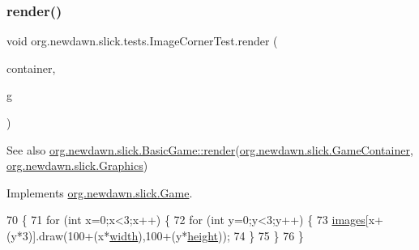 \subsubsection{\texorpdfstring{render()}{render()}}
{\footnotesize\ttfamily void org.\+newdawn.\+slick.\+tests.\+Image\+Corner\+Test.\+render (\begin{DoxyParamCaption}\item[{\mbox{\hyperlink{classorg_1_1newdawn_1_1slick_1_1_game_container}{Game\+Container}}}]{container,  }\item[{\mbox{\hyperlink{classorg_1_1newdawn_1_1slick_1_1_graphics}{Graphics}}}]{g }\end{DoxyParamCaption})\hspace{0.3cm}{\ttfamily [inline]}}

\begin{DoxySeeAlso}{See also}
\mbox{\hyperlink{interfaceorg_1_1newdawn_1_1slick_1_1_game_af1a4670d43eb3ba04dfcf55ab1975b64}{org.\+newdawn.\+slick.\+Basic\+Game\+::render}}(\mbox{\hyperlink{classorg_1_1newdawn_1_1slick_1_1_game_container}{org.\+newdawn.\+slick.\+Game\+Container}}, \mbox{\hyperlink{classorg_1_1newdawn_1_1slick_1_1_graphics}{org.\+newdawn.\+slick.\+Graphics}}) 
\end{DoxySeeAlso}


Implements \mbox{\hyperlink{interfaceorg_1_1newdawn_1_1slick_1_1_game_af1a4670d43eb3ba04dfcf55ab1975b64}{org.\+newdawn.\+slick.\+Game}}.


\begin{DoxyCode}
70                                                             \{
71         \textcolor{keywordflow}{for} (\textcolor{keywordtype}{int} x=0;x<3;x++) \{
72             \textcolor{keywordflow}{for} (\textcolor{keywordtype}{int} y=0;y<3;y++) \{
73                 \mbox{\hyperlink{classorg_1_1newdawn_1_1slick_1_1tests_1_1_image_corner_test_ae322db8fe27b43b8aa623e57d95c7354}{images}}[x+(y*3)].draw(100+(x*\mbox{\hyperlink{classorg_1_1newdawn_1_1slick_1_1tests_1_1_image_corner_test_aca2e57fb5527d6b042197d6cdc90b150}{width}}),100+(y*\mbox{\hyperlink{classorg_1_1newdawn_1_1slick_1_1tests_1_1_image_corner_test_ac43e9974d6954165e5af5b8d748df6a0}{height}}));
74             \}
75         \}
76     \}
\end{DoxyCode}
\mbox{\label{classorg_1_1newdawn_1_1slick_1_1tests_1_1_image_corner_test_afe344e0649c5eb63c746e9028ed4aa85}} 
